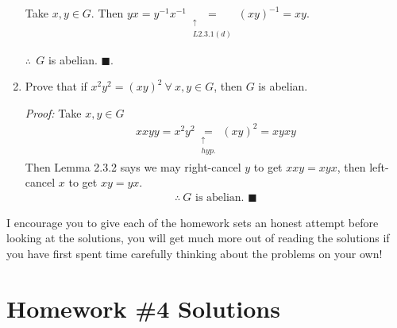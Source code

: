 \begin{enumerate}
Take $x,y \in G$. Then $yx = y^{-1}x^{-1} \underset{\substack{\uparrow \\ L2.3.1 (d)}}{=} (xy)^{-1} = xy$.

$\therefore \ \ G $ is abelian. $\blacksquare$.

\item Prove that if $x^2y^2 = (xy)^2 \ \forall \ x,y \in G$, then $G$ is abelian.

\textit{Proof:} Take $x,y \in G$
\begin{align*}
    xxyy = x^2y^2 \underset{\substack{\uparrow \\ hyp.}}{=} (xy)^2 = xyxy
\end{align*}
Then Lemma 2.3.2 says we may right-cancel $y$ to get $xxy = xyx$, then left-cancel $x$ to get $xy=yx$. 
\begin{align*}
    \therefore \ G \text{ is abelian. }\blacksquare 
\end{align*}
\end{enumerate}

\newpage

\begin{tcolorbox}
    I encourage you to give each of the homework sets an honest attempt before looking at the solutions, you will get much more out of reading the solutions if you have first spent time carefully thinking about the problems on your own!
\end{tcolorbox}
\vspace{-0.2in}
\section{Homework \#4 Solutions}

